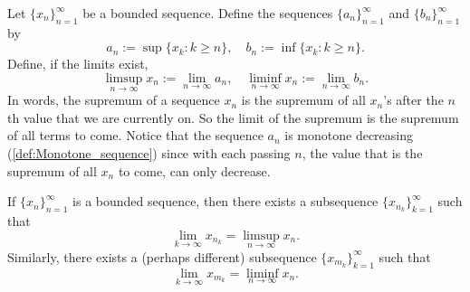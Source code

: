 \documentclass[../main.tex]{subfiles}
\begin{document}
    
    
    
    
    
    
    
    
    
    
    
    
    
    
    
    
    
    
    
    
    
    
    
    
    
    
    \begin{definition} \label{def:limsup_liminf}
    Let \( \{x_n\}_{n=1}^{\infty} \) be a bounded sequence. Define the sequences \( \{a_n\}_{n=1}^{\infty} \) and \( \{b_n\}_{n=1}^{\infty} \) by
    \[
    a_n := \sup\{ x_k : k \geq n \}, \quad b_n := \inf\{ x_k : k \geq n \}.
    \]
    Define, if the limits exist,
    \[
    \limsup_{n \to \infty} x_n := \lim_{n \to \infty} a_n, \quad \liminf_{n \to \infty} x_n := \lim_{n \to \infty} b_n.
    \]
    In words, the supremum of a sequence $x_n$ is the supremum of all $x_n$'s after the $n$th value that we are currently on. So the limit of the supremum is the supremum of all terms to 
    come. Notice that the sequence $a_n$ is monotone decreasing (\ref{def:Monotone_sequence}) since 
    with each passing $n$, the value that is the supremum of all $x_n$ to come,
    can only decrease. 


    \end{definition}
    
    
    
    
    
    
    
    
    
    
    
    
    
    
    
    
    
    
    
    
    
    
    
    
    
    
    
    
    
    
    
    
    
    \begin{theorem}\label{thm: lim sup lim inf subsequence}
    If \( \{x_n\}_{n=1}^{\infty} \) is a bounded sequence, then there exists a subsequence \( \{x_{n_k}\}_{k=1}^{\infty} \) such that
    \[
    \lim_{k \to \infty} x_{n_k} = \limsup_{n \to \infty} x_n.
    \]
    Similarly, there exists a (perhaps different) subsequence \( \{x_{m_k}\}_{k=1}^{\infty} \) such that
    \[
    \lim_{k \to \infty} x_{m_k} = \liminf_{n \to \infty} x_n.
    \]
    \end{theorem}
    
\end{document}
